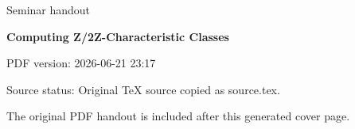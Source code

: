 \documentclass[11pt,a4paper]{article}
\newcommand{\seminartitle}{Computing Z/2Z-Characteristic Classes}
\newcommand{\seminarsubtitle}{Seminar handout}
\newcommand{\seminardate}{2026-06-21 23:17}
\newcommand{\seminarsourcestatus}{Original TeX source copied as source.tex.}
\begin{document}
\begin{titlepage}
\thispagestyle{empty}
\vspace*{0.16\textheight}
{\Large\color{seminarblue}\seminarsubtitle\par}
\vspace{1.5em}
{\LARGE\bfseries \seminartitle\par}
\vspace{2em}
{\large PDF version: \seminardate\par}
\vfill
{\small Source status: \seminarsourcestatus\par}
\vspace{1em}
{\small The original PDF handout is included after this generated cover page.\par}
\end{titlepage}

\clearpage
\hypersetup{pageanchor=false}

\end{document}
